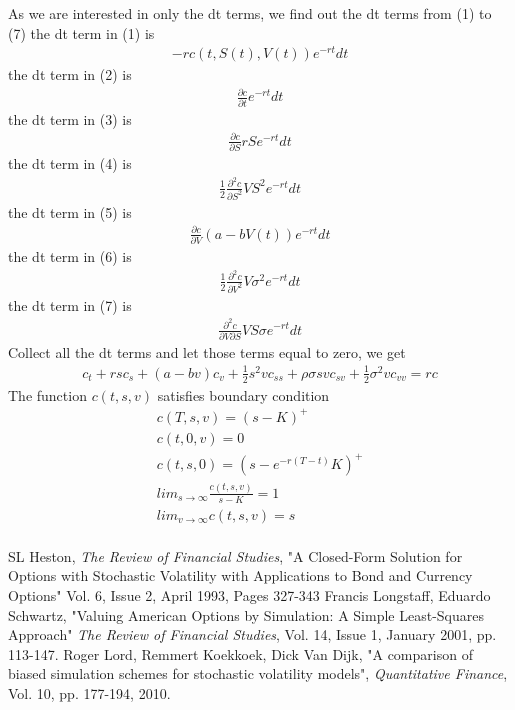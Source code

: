 \documentclass[a4paper]{article}
\begin{document}
As we are interested in only the dt terms, we find out the dt terms from (1) to (7)
the dt term in (1) is
\begin{align*}
	-rc(t, S(t), V(t))e^{-rt}dt
\end{align*}
the dt term in (2) is
\begin{align*}
	\frac{\partial c}{\partial t}e^{-rt}dt
\end{align*}
the dt term in (3) is
\begin{align*}
	\frac{\partial c}{\partial S}rSe^{-rt}dt
\end{align*}
the dt term in (4) is
\begin{align*}
	\frac{1}{2} \frac{\partial^2 c}{\partial S^2}VS^2e^{-rt}dt
\end{align*}
the dt term in (5) is
\begin{align*}
	\frac{\partial c}{\partial V}(a-bV(t))e^{-rt}dt
\end{align*}
the dt term in (6) is
\begin{align*}
	\frac{1}{2} \frac{\partial^2 c}{\partial V^2}V\sigma^2e^{-rt}dt
\end{align*}
the dt term in (7) is
\begin{align*}
	\frac{\partial^2 c}{\partial V \partial S} VS\sigma e^{-rt}dt
\end{align*}
Collect all the dt terms and let those terms equal to zero, we get
\begin{align}\label{c}
	c_t + rs c_s + (a-bv)c_v + \frac{1}{2} s^2 v c_{ss} + \rho \sigma svc_{sv}
	+\frac{1}{2} \sigma^2vc_{vv} = rc
\end{align}
The function $c(t, s, v)$ satisfies boundary condition
\begin{align*}
	c(T, s, v) = (s-K)^+ \\
	c(t, 0, v) = 0 \\
	c(t, s, 0) = (s - e^{-r(T-t)}K)^+\\
	lim_{s \to \infty} \frac{c(t, s, v)}{s-K} = 1 \\
	lim_{v \to \infty} c(t, s, v) = s\\  
\end{align*}
\begin{thebibliography}{9}
		SL Heston,
		\textit{The Review of Financial Studies},
		"A Closed-Form Solution for Options with Stochastic Volatility with Applications 
		to Bond and Currency Options"
		Vol. 6, Issue 2, April 1993, Pages 327-343
		Francis Longstaff, Eduardo Schwartz, 
		"Valuing American Options by Simulation: A Simple Least-Squares Approach"
		\textit{The Review of Financial Studies}, 
		Vol. 14, Issue 1, January 2001, pp. 113-147.
		Roger Lord, Remmert Koekkoek, Dick Van Dijk, 
		"A comparison of biased simulation schemes for stochastic volatility models", 
		\textit{Quantitative Finance}, 
		Vol. 10, pp. 177-194, 2010.
\end{thebibliography}
\end{document}
